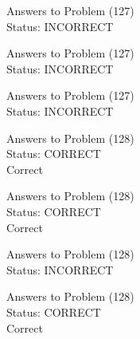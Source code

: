 \documentclass[11pt]{article}
\begin{document}
\begin{minipage}[t]{0.5\textwidth}
  {\centering
  
  Answers to Problem (127)\\
  Status: INCORRECT\\
  
  }
\end{minipage}
\begin{minipage}[t]{0.5\textwidth}
  {\centering
  
  Answers to Problem (127)\\
  Status: INCORRECT\\
  
  }
\end{minipage}
\begin{minipage}[t]{0.5\textwidth}
  {\centering
  
  Answers to Problem (127)\\
  Status: INCORRECT\\
  
  }
\end{minipage}
\begin{minipage}[t]{0.5\textwidth}
  {\centering
  
  Answers to Problem (128)\\
  Status: CORRECT\\
  Correct\\
  }
\end{minipage}
\begin{minipage}[t]{0.5\textwidth}
  {\centering
  
  Answers to Problem (128)\\
  Status: CORRECT\\
  Correct\\
  }
\end{minipage}
\begin{minipage}[t]{0.5\textwidth}
  {\centering
  
  Answers to Problem (128)\\
  Status: INCORRECT\\
  
  }
\end{minipage}
\begin{minipage}[t]{0.5\textwidth}
  {\centering
  
  Answers to Problem (128)\\
  Status: CORRECT\\
  Correct\\
  }
\end{minipage}
\end{document}
